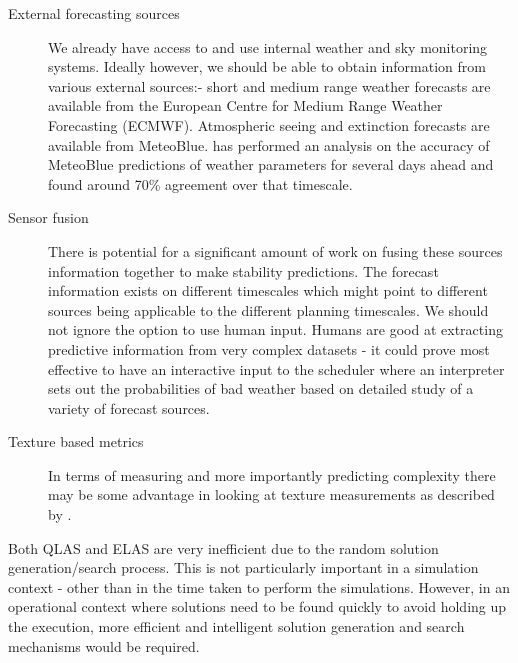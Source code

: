 \begin{description}
\item [External forecasting sources]
We already have access to and use internal weather and sky monitoring systems. Ideally however, we should be able to obtain information from various external sources:- short and medium range weather forecasts are available from the European Centre for Medium Range Weather Forecasting (ECMWF). Atmospheric seeing and extinction forecasts are available from MeteoBlue. \cite{marchant09forecast} has performed an analysis on the accuracy of MeteoBlue predictions of weather parameters for several days ahead and found around 70\% agreement over that timescale. 

\item [Sensor fusion]
There is potential for a significant amount of work on fusing these sources information together to make stability predictions. The forecast information exists on different timescales which might point to different sources being applicable to the different planning timescales. We should not ignore the option to use human input. Humans are good at extracting predictive information from very complex datasets - it could prove most effective to have an interactive input to the scheduler where an interpreter sets out the probabilities of bad weather based on detailed study of a variety of forecast sources. 

\item [Texture based metrics]
In terms of measuring and more importantly predicting complexity there may be some advantage in looking at texture measurements as described by \citet{beck97texturebased}.

\end{description}

Both QLAS and ELAS are very inefficient due to the random solution generation/search process. This is not particularly important in a simulation context - other than in the time taken to perform the simulations. However, in an operational context where solutions need to be found quickly to avoid holding up the execution, more  efficient and intelligent solution generation and search mechanisms would be required.


